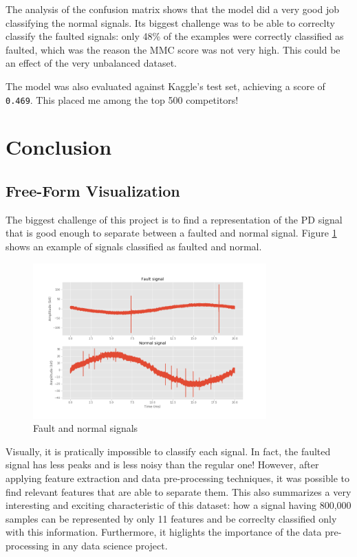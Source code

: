 \documentclass[11pt]{article}
\begin{document}
The analysis of the confusion matrix shows that the model did a very
good job classifying the normal signals. Its biggest challenge was to be
able to correclty classify the faulted signals: only 48\% of the
examples were correctly classified as faulted, which was the reason the
MMC score was not very high. This could be an effect of the very
unbalanced dataset.

The model was also evaluated against Kaggle's test set, achieving a
score of \texttt{0.469}. This placed me among the top 500 competitors!

    \hypertarget{v.-conclusion}{%
\section{Conclusion}\label{v.-conclusion}}

\hypertarget{free-form-visualization}{%
\subsection{Free-Form Visualization}\label{free-form-visualization}}

The biggest challenge of this project is to find a representation of the
PD signal that is good enough to separate between a faulted and normal
signal. Figure \ref{fig:free_form_pd} shows an example of signals classified as
faulted and normal.

\begin{figure}[h]
\centering
\includegraphics[width=0.8\textwidth]{signal_fault_normal_raw_freeform.png}
\caption{Fault and normal signals}
\label{fig:free_form_pd}
\end{figure}

Visually, it is pratically impossible to classify each signal. In fact,
the faulted signal has less peaks and is less noisy than the regular
one! However, after applying feature extraction and data pre-processing
techniques, it was possible to find relevant features that are able to
separate them. This also summarizes a very interesting and exciting
characteristic of this dataset: how a signal having 800,000 samples can
be represented by only 11 features and be correclty classified only with
this information. Furthermore, it higlights the importance of the data
pre-processing in any data science project.
\end{document}
